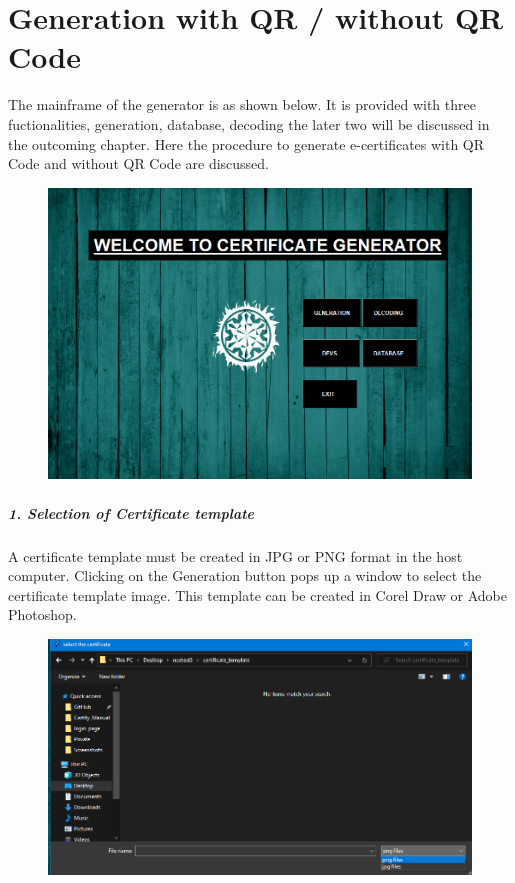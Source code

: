 \chapter{Generation with QR / without QR Code}

The mainframe of the generator is as shown below. It is provided with three fuctionalities, generation, database, decoding the later two will be discussed in the outcoming chapter. Here the procedure to generate e-certificates with QR Code and without QR Code are discussed.


\begin{figure}[H]
	\centering
	\includegraphics[width=0.85\linewidth]{"images/generation_qr_nqr/Screenshot (28)"}
	\label{fig:screenshot-28}
\end{figure}

\newpage
\paragraph{1. Selection of Certificate template}
A certificate template must be created in JPG or PNG format in the host computer. Clicking on the Generation button pops up a window to select the certificate template image. This template can be created in Corel Draw or Adobe Photoshop.

\begin{figure}[H]
	\centering
	\includegraphics[width=0.85\linewidth]{"images/generation_qr_nqr/Screenshot (29)"}
	\label{fig:screenshot-29}
\end{figure}


